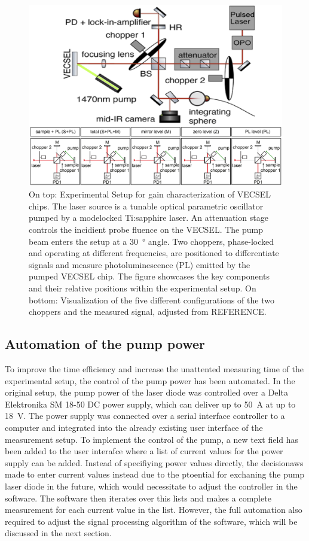 \begin{figure}[ht]
    \centering
    \includegraphics[width=0.8\linewidth]{images/setup.png}
    \caption{On top: Experimental Setup for gain characterization of VECSEL chips. The laser source is a tunable optical parametric oscillator pumped by a modelocked Ti:sapphire laser. An attenuation stage controls the incidient probe fluence on the VECSEL. The pump beam enters the setup at a \qty{30}{\degree} angle. Two choppers, phase-locked and operating at different frequencies, are positioned to differentiate signals and measure photoluminescence (PL) emitted by the pumped VECSEL chip. The figure showcases the key components and their relative positions within the experimental setup.
    On bottom: Visualization of the five different configurations of the two choppers and the measured signal, adjusted from REFERENCE.}
    \label{fig:setup}
\end{figure}

\subsection{Automation of the pump power}{\label{subsubsection:pump}}

To improve the time efficiency and increase the unattented measuring time of the experimental setup, the control of the pump power has been automated. In the original setup, the pump power of the laser diode was controlled over a Delta Elektronika SM 18-50 DC power supply, which can deliver up to \qty{50}{\ampere} at up to \qty{18}{\volt}. The power supply was connected over a serial interface controller to a computer and integrated into the already existing user interface of the measurement setup. To implement the control of the pump, a new text field has been added to the user interafce where a list of current values for the power supply can be added. Instead of specifiying power values directly, the decisionaws made to enter current values instead due to the ptoential for exchaning the pump laser diode in the future, which would necessitate to adjust the controller in the software. The software then iterates over this lists and makes a complete measurement for each current value in the list. However, the full automation also required to adjust the signal processing algorithm of the software, which will be discussed in the next section. 

